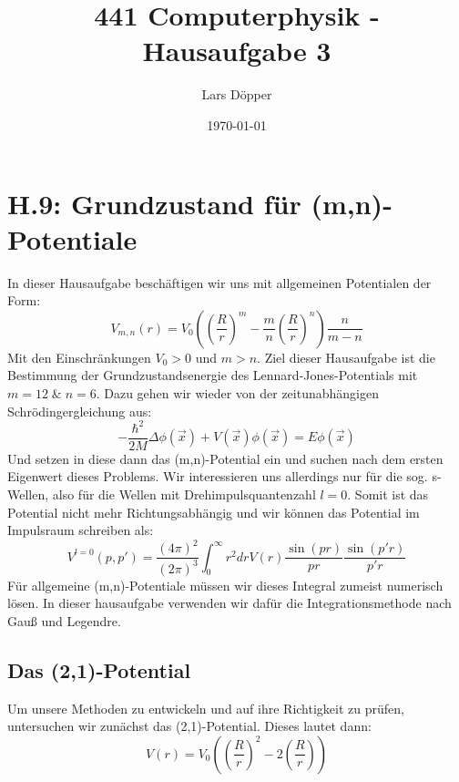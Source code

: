 \documentclass[11pt,a4paper]{article}
\author{Lars Döpper}
\date{\today}
\title{441 Computerphysik - Hausaufgabe 3}
\begin{document}
	\maketitle
\section*{H.9: Grundzustand für (m,n)-Potentiale}
In dieser Hausaufgabe beschäftigen wir uns mit allgemeinen Potentialen der Form:
\begin{equation}
V_{m,n}(r) = V_0\left( \left(\frac{R}{r}\right)^{m} -\frac{m}{n}\left(\frac{R}{r}\right)^{n} \right)\frac{n}{m-n}
\end{equation}
Mit den Einschränkungen $V_0>0$ und $m>n$. Ziel dieser Hausaufgabe ist  die Bestimmung der Grundzustandsenergie des Lennard-Jones-Potentials mit $m=12 \; \&\; n=6$. Dazu gehen wir wieder von der zeitunabhängigen Schrödingergleichung aus:
\begin{equation}\label{eq:schrödinger}
	-\frac{\hbar^2}{2M}\Delta\phi(\vec{x}) + V(\vec{x})\phi(\vec{x}) = E\phi(\vec{x})
\end{equation}
Und setzen in diese dann das (m,n)-Potential ein und suchen nach dem ersten Eigenwert dieses Problems.
Wir interessieren uns allerdings nur für die sog. s-Wellen, also für die Wellen mit Drehimpulsquantenzahl $l=0$. Somit ist das Potential nicht mehr Richtungsabhängig und wir können das Potential im  Impulsraum schreiben als:
\begin{equation}
	V^{l=0}(p, p')=\frac{(4\pi)^2}{(2\pi)^3}\int_{0}^{\infty}r^2drV(r)\frac{\sin(pr)}{pr}\frac{\sin(p'r)}{p'r}
\end{equation}
Für allgemeine (m,n)-Potentiale müssen wir dieses Integral zumeist numerisch lösen. In dieser hausaufgabe verwenden wir dafür die Integrationsmethode nach Gauß und Legendre.
\subsection*{Das  (2,1)-Potential}
Um unsere Methoden zu entwickeln und auf ihre Richtigkeit zu prüfen, untersuchen wir zunächst das  (2,1)-Potential.  Dieses lautet dann:
\begin{equation}\label{eq:21pot}
	V(r) = V_0\left(\left(\frac{R}{r}\right)^2 -2\left(\frac{R}{r}\right)\right)
\end{equation}
\end{document}

